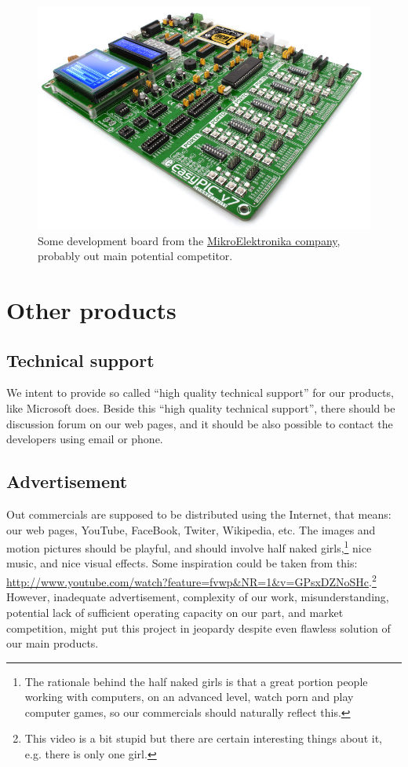 \documentclass[a4paper,twoside,15pt]{book}
\begin{document}
		\begin{figure}[h!]
			\centering{}
			\includegraphics[width=.9\textwidth]{images/snapshot0.png}
			\caption{Some development board from the \href{http://www.mikroe.com/}{MikroElektronika company}, probably out main potential competitor.}
		\end{figure}

	\pagebreak

	\section{Other products}
		\subsection{Technical support}
			We intent to provide so called ``high quality technical support'' for our products, like Microsoft does. Beside this ``high quality technical support'', there should be discussion forum on our web pages, and it should be also possible to contact the developers using email or phone.

		\subsection{Advertisement}
			Out commercials are supposed to be distributed using the Internet, that means: our web pages, YouTube, FaceBook, Twiter, Wikipedia, etc. The images and motion pictures should be playful, and should involve half naked girls,\footnote{The rationale behind the half naked girls is that a great portion people working with computers, on an advanced level, watch porn and play computer games, so our commercials should naturally reflect this.} nice music, and nice visual effects. Some inspiration could be taken from this: \url{http://www.youtube.com/watch?feature=fvwp&NR=1&v=GPsxDZNoSHc}.\footnote{This video is a bit stupid but there are certain interesting things about it, e.g. there is only one girl.} However, inadequate advertisement, complexity of our work, misunderstanding, potential lack of sufficient operating capacity on our part, and market competition, might put this project in jeopardy despite even flawless solution of our main products.
\end{document}
